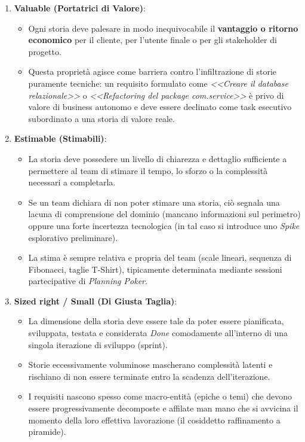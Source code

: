 \documentclass[12pt]{extarticle}
\begin{document}
\begin{enumerate}
    \item \textbf{Valuable (Portatrici di Valore)}:
    \begin{itemize}
        \item Ogni storia deve palesare in modo inequivocabile il \textbf{vantaggio o ritorno economico} per il cliente, per l'utente finale o per gli stakeholder di progetto.
        \item Questa proprietà agisce come barriera contro l'infiltrazione di storie puramente tecniche: un requisito formulato come \textit{<<Creare il database relazionale>>} o \textit{<<Refactoring del package com.service>>} è privo di valore di business autonomo e deve essere declinato come task esecutivo subordinato a una storia di valore reale.
    \end{itemize}

    \item \textbf{Estimable (Stimabili)}:
    \begin{itemize}
        \item La storia deve possedere un livello di chiarezza e dettaglio sufficiente a permettere al team di stimare il tempo, lo sforzo o la complessità necessari a completarla.
        \item Se un team dichiara di non poter stimare una storia, ciò segnala una lacuna di comprensione del dominio (mancano informazioni sul perimetro) oppure una forte incertezza tecnologica (in tal caso si introduce uno \textit{Spike} esplorativo preliminare).
        \item La stima è sempre relativa e propria del team (scale lineari, sequenza di Fibonacci, taglie T-Shirt), tipicamente determinata mediante sessioni partecipative di \textit{Planning Poker}.
    \end{itemize}

    \item \textbf{Sized right / Small (Di Giusta Taglia)}:
    \begin{itemize}
        \item La dimensione della storia deve essere tale da poter essere pianificata, sviluppata, testata e considerata \textit{Done} comodamente all'interno di una singola iterazione di sviluppo (sprint).
        \item Storie eccessivamente voluminose mascherano complessità latenti e rischiano di non essere terminate entro la scadenza dell'iterazione.
        \item I requisiti nascono spesso come macro-entità (epiche o temi) che devono essere progressivamente decomposte e affilate man mano che si avvicina il momento della loro effettiva lavorazione (il cosiddetto raffinamento a piramide).
    \end{itemize}


\end{enumerate}
\end{document}
